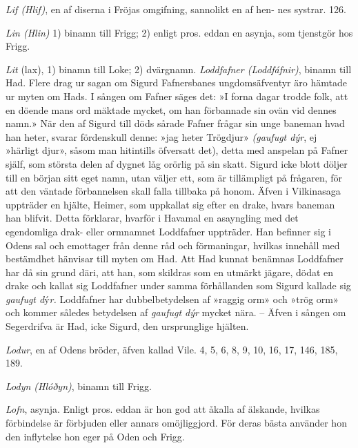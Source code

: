 \emph{Lif (Hlif)}, en af diserna i Fröjas omgifning, sannolikt en af
hen- nes systrar. 126.

\emph{Lin (Hlin)} 1) binamn till Frigg; 2) enligt pros. eddan en asynja,
som tjenstgör hos Frigg.

\emph{Lit} (lax), 1) binamn till Loke; 2) dvärgnamn. \emph{Loddfafner
(Loddfáfnir)}, binamn till Had. Flere drag ur sagan om Sigurd
Fafnersbanes ungdomsäfventyr äro hämtade ur myten om Hads. I sången om
Fafner säges det: »I forna dagar trodde folk, att en döende mans ord
mäktade mycket, om han förbannade sin ovän vid dennes namn.» När den af
Sigurd till döds sårade Fafner frågar sin unge baneman hvad han heter,
svarar fördenskull denne: »jag heter Trögdjur» \emph{(gaufugt dýr}, ej
»härligt djur», såsom man hitintills öfversatt det), detta med anspelan
på Fafner själf, som största delen af dygnet låg orörlig på sin skatt.
Sigurd icke blott döljer till en början sitt eget namn, utan väljer ett,
som är tillämpligt på frågaren, för att den väntade förbannelsen skall
falla tillbaka på honom. Äfven i Vilkinasaga uppträder en hjälte,
Heimer, som uppkallat sig efter en drake, hvars baneman han blifvit.
Detta förklarar, hvarför i Havamal en asayngling med det egendomliga
drak- eller ormnamnet Loddfafner uppträder. Han befinner sig i Odens sal
och emottager från denne råd och förmaningar, hvilkas innehåll med
bestämdhet hänvisar till myten om Had. Att Had
\protect\hypertarget{lb1625905.xhtmlux5cux23start230}{}{}\protect\hypertarget{lb1625905.xhtmlux5cux23start230-a}{}{}\protect\hypertarget{lb1625905.xhtmlux5cux23start230-b}{}{}\protect\hypertarget{lb1625905.xhtmlux5cux23start230-c}{}{}\protect\hypertarget{lb1625905.xhtmlux5cux23start230-d}{}{}
kunnat benämnas Loddfafner har då sin grund däri, att han, som skildras
som en utmärkt jägare, dödat en drake och kallat sig Loddfafner under
samma förhållanden som Sigurd kallade sig \emph{gaufugt d}ý\emph{r.}
Loddfafner har dubbelbetydelsen af »raggig orm» och »trög orm» och
kommer således betydelsen af \emph{gaufugt dýr} mycket nära. -- Äfven i
sången om Segerdrifva är Had, icke Sigurd, den ursprunglige hjälten.

\emph{Lodur}, en af Odens bröder, äfven kallad Vile. 4, 5, 6, 8, 9, 10,
16, 17, 146, 185, 189.

\emph{Lodyn (Hlóðyn)}, binamn till Frigg.

\emph{Lofn}, asynja. Enligt pros. eddan är hon god att åkalla af
älskande, hvilkas förbindelse är förbjuden eller annars omöjliggjord.
För deras bästa använder hon den inflytelse hon eger på Oden och Frigg.

